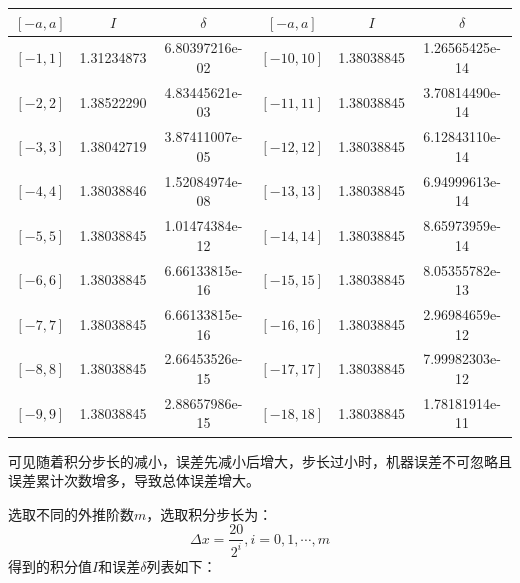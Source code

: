 \documentclass[a4paper]{book}
\begin{document}
\begin{enumerate}
\begin{table}[ht!]
    \begin{center}
    \begin{tabular}{|ccc|ccc|}
        \hline
        $[-a,a]$ & $I$ & $\delta$ & $[-a,a]$ & $I$ & $\delta$ \\
        \hline
        $[-1,1]$ & 1.31234873 & 6.80397216e-02 & $[-10,10]$ & 1.38038845 & 1.26565425e-14 \\
        $[-2,2]$ & 1.38522290 & 4.83445621e-03 & $[-11,11]$ & 1.38038845 & 3.70814490e-14 \\
        $[-3,3]$ & 1.38042719 & 3.87411007e-05 & $[-12,12]$ & 1.38038845 & 6.12843110e-14 \\
        $[-4,4]$ & 1.38038846 & 1.52084974e-08 & $[-13,13]$ & 1.38038845 & 6.94999613e-14 \\
        $[-5,5]$ & 1.38038845 & 1.01474384e-12 & $[-14,14]$ & 1.38038845 & 8.65973959e-14 \\
        $[-6,6]$ & 1.38038845 & 6.66133815e-16 & $[-15,15]$ & 1.38038845 & 8.05355782e-13 \\
        $[-7,7]$ & 1.38038845 & 6.66133815e-16 & $[-16,16]$ & 1.38038845 & 2.96984659e-12 \\
        $[-8,8]$ & 1.38038845 & 2.66453526e-15 & $[-17,17]$ & 1.38038845 & 7.99982303e-12 \\
        $[-9,9]$ & 1.38038845 & 2.88657986e-15 & $[-18,18]$ & 1.38038845 & 1.78181914e-11 \\
        \hline
    \end{tabular}
\end{center}
\end{table}

可见随着积分步长的减小，误差先减小后增大，步长过小时，机器误差不可忽略且误差累计次数增多，导致总体误差增大。

选取不同的外推阶数$m$，选取积分步长为：
\[
    \Delta x=\dfrac{20}{2^i}, i = 0,1,\cdots,m
\]
得到的积分值$I$和误差$\delta$列表如下：


\end{enumerate}
\end{document}
